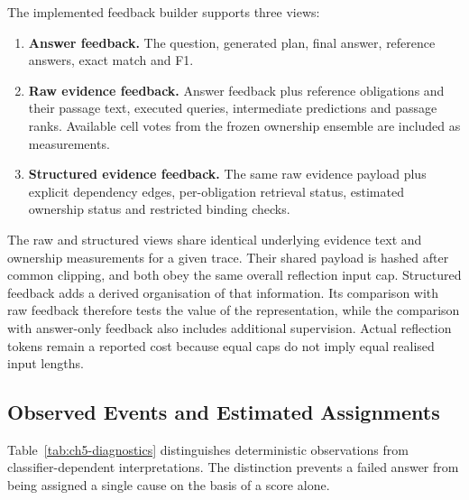 The implemented feedback builder supports three views:
\begin{enumerate}
\item \textbf{Answer feedback.} The question, generated plan, final answer,
      reference answers, exact match and F1.
\item \textbf{Raw evidence feedback.} Answer feedback plus reference
      obligations and their passage text, executed queries, intermediate
      predictions and passage ranks. Available cell votes from the frozen
      ownership ensemble are included as measurements.
\item \textbf{Structured evidence feedback.} The same raw evidence payload
      plus explicit dependency edges, per-obligation retrieval status,
      estimated ownership status and restricted binding checks.
\end{enumerate}

The raw and structured views share identical underlying evidence text and
ownership measurements for a given trace. Their shared payload is hashed
after common clipping, and both obey the same overall reflection input cap.
Structured feedback adds a derived organisation of that information. Its
comparison with raw feedback therefore tests the value of the representation,
while the comparison with answer-only feedback also includes additional
supervision. Actual reflection tokens remain a reported cost because equal
caps do not imply equal realised input lengths.

\subsection{Observed Events and Estimated Assignments}

Table~\ref{tab:ch5-diagnostics} distinguishes deterministic observations from
classifier-dependent interpretations. The distinction prevents a failed
answer from being assigned a single cause on the basis of a score alone.

